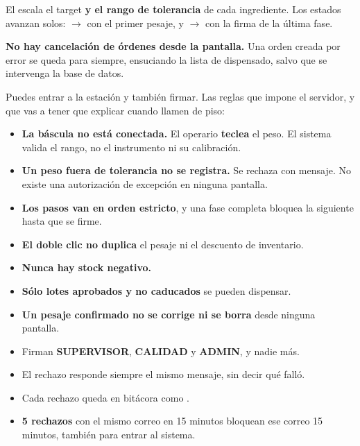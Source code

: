 

\vspace{6pt}

El  escala el target \textbf{y el rango de tolerancia} de cada
ingrediente. Los estados avanzan solos: \pendiente{} $\rightarrow$ \enproceso{} con el
primer pesaje, y $\rightarrow$ \dispensado{} con la firma de la última fase.

\textbf{No hay cancelación de órdenes desde la pantalla.} Una orden creada por error se
queda \pendiente{} para siempre, ensuciando la lista de dispensado, salvo que se
intervenga la base de datos.

\newpage
{}

Puedes entrar a la estación y también firmar. Las reglas que impone el servidor, y que
vas a tener que explicar cuando llamen de piso:

\begin{itemize}
    \item \textbf{La báscula no está conectada.} El operario \textbf{teclea} el peso.
          El sistema valida el rango, no el instrumento ni su calibración.
    \item \textbf{Un peso fuera de tolerancia no se registra.} Se rechaza con mensaje.
          No existe una autorización de excepción en ninguna pantalla.
    \item \textbf{Los pasos van en orden estricto}, y una fase completa bloquea la
          siguiente hasta que se firme.
    \item \textbf{El doble clic no duplica} el pesaje ni el descuento de inventario.
    \item \textbf{Nunca hay stock negativo.}
    \item \textbf{Sólo lotes aprobados y no caducados} se pueden dispensar.
    \item \textbf{Un pesaje confirmado no se corrige ni se borra} desde ninguna pantalla.
\end{itemize}



\begin{itemize}
    \item Firman \textbf{SUPERVISOR}, \textbf{CALIDAD} y \textbf{ADMIN}, y nadie más.
    \item El rechazo responde siempre el mismo mensaje, sin decir qué falló.
    \item Cada rechazo queda en bitácora como .
    \item \textbf{5 rechazos} con el mismo correo en 15 minutos bloquean ese correo
          15 minutos, también para entrar al sistema.
\end{itemize}

